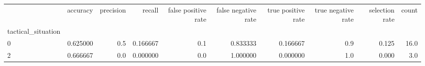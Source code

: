 \begin{tabular}{lrrrrrrrrr}
\toprule
{} &  accuracy &  precision &    recall &  false positive rate &  false negative rate &  true positive rate &  true negative rate &  selection rate &  count \\
tactical\_situation &           &            &           &                      &                      &                     &                     &                 &        \\
\midrule
0                  &  0.625000 &        0.5 &  0.166667 &                  0.1 &             0.833333 &            0.166667 &                 0.9 &           0.125 &   16.0 \\
2                  &  0.666667 &        0.0 &  0.000000 &                  0.0 &             1.000000 &            0.000000 &                 1.0 &           0.000 &    3.0 \\
\bottomrule
\end{tabular}
